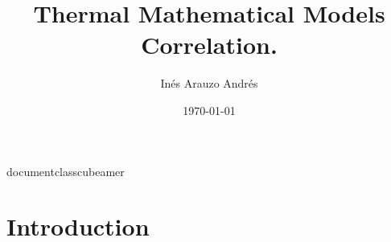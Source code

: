 \2documentclass{cubeamer}
\usepackage{lmodern}
\usepackage{graphicx}

\title{Thermal Mathematical Models Correlation.}
\author[Inés Arauzo Andres]{Inés Arauzo Andrés}
\date{\today} %




\maketitle
\cutoc

\section{Introduction}

